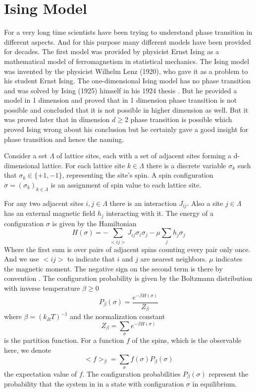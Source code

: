 	
	
\section{Ising Model}
	For a very long time scientists have been trying to understand phase transition in different aspects. And for this purpose many different models have been provided for decades. The first model was provided by physicist Ernst Ising as a mathematical model of ferromagnetism in statistical mechanics. 
	The Ising model was invented by the physicist Wilhelm Lenz (1920), who gave it as a problem to his student Ernst Ising. The one-dimensional Ising model has no phase transition and was solved by Ising (1925) himself in his 1924 thesis \cite{Ising1925}.
	But he provided a model in 1 dimension and proved that in 1 dimension phase transition is not possible and concluded that it is not possible in higher dimension as well. But it was proved later that in dimension $d \geq 2$ phase transition is possible \cite{Yang1952, Montroll1963} which proved Ising wrong about his conclusion but he certainly gave a good insight for phase transition and hence the naming.
	
	Consider a set $\Lambda$ of lattice sites, each with a set of adjacent sites forming a d-dimensional lattice. For each lattice site $k\in\Lambda$ there is a discrete variable $\sigma_k$ such that $\sigma_k \in \{+1, -1\}$, representing the site's spin. A spin configuration $\sigma = \left(\sigma_k\right)_{k\in\Lambda}$ is an assignment of spin value to each lattice site.
	
	For any two adjacent sites $i,j \in \Lambda$ there is an interaction $J_{ij}$. Also a site $j\in \Lambda$ has an external magnetic field $h_j$ interacting with it. The energy of a configuration $\sigma$ is given by the Hamiltonian
	\begin{equation}
		H(\sigma) = - \sum_{<i j>} J_{ij} \sigma_i \sigma_j - \mu \sum_{j} h_j \sigma_j
	\end{equation}
	Where the first sum is over pairs of adjacent spins counting every pair only once. And we use $<ij>$ to indicate that $i$ and $j$ are nearest neighbors. $\mu$ indicates the magnetic moment. The negative sign on the second term is there by convention \cite{Baierlein1999}. The configuration probability is given by the Boltzmann distribution with inverse temperature $\beta \geq 0$
	\begin{equation}
		P_\beta (\sigma) = \frac{e^{- \beta H(\sigma)}}{Z_\beta}
	\end{equation}
	where $\beta = \left(k_B T\right)^{-1}$ and the normalization constant
	\begin{equation}
		Z_\beta = \sum_\sigma e^{-\beta H(\sigma)}
	\end{equation}
	is the partition function. For a function $f$ of the spins, which is the observable here, we denote
	\begin{equation}
		<f>_{\beta} = \sum_{\sigma} f(\sigma) P_\beta(\sigma)
	\end{equation}
	the expectation value of $f$.
	The configuration probabilities $P_\beta(\sigma)$ represent the probability that the system in in a state with configuration $\sigma$ in equilibrium.
	
